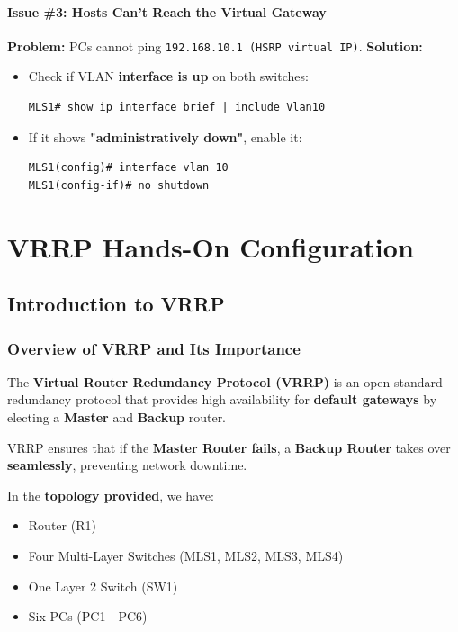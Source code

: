 \documentclass[a4paper]{book}
\begin{document}
\subsubsection{Issue \#3: Hosts Can’t Reach the Virtual Gateway}
\textbf{Problem:} PCs cannot ping \texttt{192.168.10.1 (HSRP virtual IP)}.  
\textbf{Solution:}
\begin{itemize}
\item Check if VLAN \textbf{interface is up} on both switches:
\begin{lstlisting}
MLS1# show ip interface brief | include Vlan10
\end{lstlisting}
\item If it shows \textbf{"administratively down"}, enable it:
\begin{lstlisting}
MLS1(config)# interface vlan 10
MLS1(config-if)# no shutdown
\end{lstlisting}
\end{itemize}



\chapter{VRRP Hands-On Configuration}



\section{Introduction to VRRP}

\subsection{Overview of VRRP and Its Importance}
The \textbf{Virtual Router Redundancy Protocol (VRRP)} is an open-standard redundancy protocol 
that provides high availability for \textbf{default gateways} by electing a \textbf{Master} and 
\textbf{Backup} router.

VRRP ensures that if the \textbf{Master Router fails}, a \textbf{Backup Router} takes over 
\textbf{seamlessly}, preventing network downtime.

In the \textbf{topology provided}, we have:
\begin{itemize}
\item Router (R1)
\item Four Multi-Layer Switches (MLS1, MLS2, MLS3, MLS4)
\item One Layer 2 Switch (SW1)
\item Six PCs (PC1 - PC6)
\end{itemize}
\end{document}
